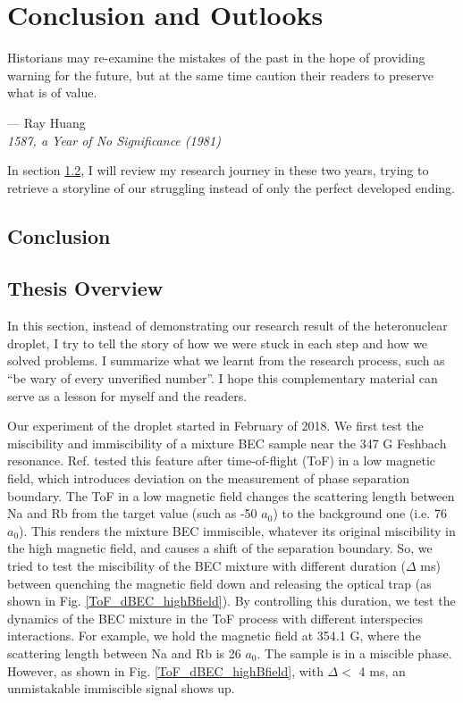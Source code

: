 \chapter{Conclusion and Outlooks}
\label{chap:conclusion}

\setlength{\unitlength}{1pt}
\setlength{\epigraphwidth}{11cm}
\epigraph{Historians may re-examine the mistakes of the past in the hope of providing warning for the future, but at the same time caution their readers to preserve what is of value. \cite{HuangRay19811ayo}}{--- Ray Huang\\ \textit{1587, a Year of No Significance (1981)}}

In section \ref{sec:intro-overview}, I will review my research journey in these two years, trying to retrieve a storyline of our struggling instead of only the perfect developed ending.

\section{Conclusion}

\section{Thesis Overview}
\label{sec:intro-overview}
In this section, instead of demonstrating our research result of the heteronuclear droplet, I try to tell the story of how we were stuck in each step and how we solved problems. I summarize what we learnt from the research process, such as ``be wary of every unverified number''. I hope this complementary material can serve as a lesson for myself and the readers.

Our experiment of the droplet started in February of 2018. We first test the miscibility and immiscibility of a mixture BEC sample near the 347 G Feshbach resonance. Ref. \cite{wang2015double} tested this feature after time-of-flight (ToF) in a low magnetic field, which introduces deviation on the measurement of phase separation boundary. The ToF in a low magnetic field changes the scattering length between Na and Rb from the target value (such as -50 \(a_0\)) to the background one (i.e. 76 \(a_0\)). This renders the mixture BEC immiscible, whatever its original miscibility in the high magnetic field, and causes a shift of the separation boundary. So, we tried to test the miscibility of the BEC mixture with different duration (\(\Delta\) ms) between quenching the magnetic field down and releasing the optical trap (as shown in Fig. \ref{ToF_dBEC_highBfield}). By controlling this duration, we test the dynamics of the BEC mixture in the ToF process with different interspecies interactions. For example, we hold the magnetic field at 354.1 G, where the scattering length between Na and Rb is 26 \(a_0\). The sample is in a miscible phase. However, as shown in Fig. \ref{ToF_dBEC_highBfield}, with \(\Delta<\) 4 ms, an unmistakable immiscible signal shows up.

